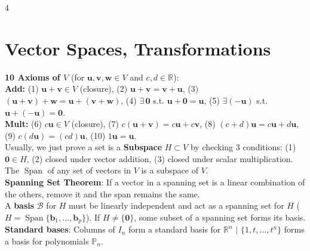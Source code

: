 \documentclass[9pt]{extarticle}
\begin{document}
\begin{multicols*}{4}
\section*{Vector Spaces, Transformations}
\textbf{10 Axioms of $V$} (for $\mathbf{u},\mathbf{v},\mathbf{w}\in V$ and $c,d\in\mathbb{R}$):\\
\textbf{Add:} (1) $\mathbf{u}+\mathbf{v}\in V$ (closure), (2) $\mathbf{u}+\mathbf{v}=\mathbf{v}+\mathbf{u}$, (3) $(\mathbf{u}+\mathbf{v})+\mathbf{w}=\mathbf{u}+(\mathbf{v}+\mathbf{w})$, (4) $\exists\,\mathbf{0}$ s.t. $\mathbf{u}+\mathbf{0}=\mathbf{u}$, (5) $\exists(-\mathbf{u})$ s.t. $\mathbf{u}+(-\mathbf{u})=\mathbf{0}$.\\
\textbf{Mult:} (6) $c\mathbf{u}\in V$ (closure), (7) $c(\mathbf{u}+\mathbf{v})=c\mathbf{u}+c\mathbf{v}$, (8) $(c+d)\mathbf{u}=c\mathbf{u}+d\mathbf{u}$, (9) $c(d\mathbf{u})=(cd)\mathbf{u}$, (10) $1\mathbf{u}=\mathbf{u}$.\\
Usually, we just prove a set is a \textbf{Subspace} $H \subset V$ by checking 3 conditions: (1) $\mathbf{0}\in H$, (2) closed under vector addition, (3) closed under scalar multiplication.\\
The $\operatorname{Span}$ of any set of vectors in $V$ is a subspace of $V$.\\
\textbf{Spanning Set Theorem}: If a vector in a spanning set is a linear combination of the others, remove it and the span remains the same.\\
A \textbf{basis} $\mathcal{B}$ for $H$ must be linearly independent and act as a spanning set for $H$ ($H=\operatorname{Span}\{\mathbf{b}_{1},\dots,\mathbf{b}_{p}\}$).
If $H\neq\{\mathbf{0}\}$, some subset of a spanning set forms its basis.\\
\textbf{Standard bases}: Columns of $I_{n}$ form a standard basis for $\mathbb{R}^{n}$ $\vert$ $\{1,t,\dots,t^{n}\}$ forms a basis for polynomials $\mathbb{P}_{n}$.


\end{multicols*}
\end{document}
